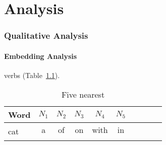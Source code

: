 \chapter{Analysis}

\subsection{Qualitative Analysis}


\subsubsection{Embedding Analysis} \label{sec:embanalysis}
 verbs (Table~\ref{tab:embtable}). 

\begin{table}[ht]
\begin{center}
\renewcommand{\tabcolsep}{2pt}
\begin{tabular}{l|ccccccccc}
\toprule
Word & $N_1$ & $N_2$ & $N_3$ & $N_4$ & $N_5$ \\ 
\toprule
\multirow{2}{*}{cat} & a & of & on & with & in
\\ 
\\
\bottomrule
\end{tabular}
\end{center}
\caption{Five nearest}
\label{tab:embtable}
\end{table}
%

